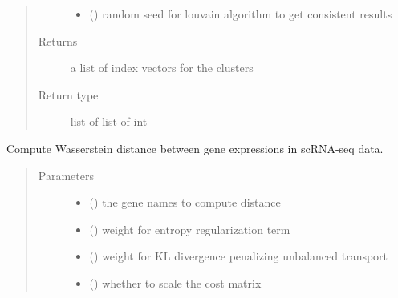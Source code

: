 \documentclass[letterpaper,10pt,english]{sphinxmanual}
\begin{document}
\begin{fulllineitems}
\begin{fulllineitems}
\begin{quote}
\begin{description}
\begin{itemize}
\item {} 
 () \textendash{} random seed for louvain algorithm to get consistent results

\end{itemize}

\item[{Returns}] \leavevmode
a list of index vectors for the clusters

\item[{Return type}] \leavevmode
list of list of int

\end{description}\end{quote}

\end{fulllineitems}


\begin{fulllineitems}
\label{\detokenize{api:spaotsc.SpaOTsc.spatial_sc.gene_gene_distance}}
Compute Wasserstein distance between gene expressions in scRNA-seq data.
\begin{quote}\begin{description}
\item[{Parameters}] \leavevmode\begin{itemize}
\item {} 
 () \textendash{} the gene names to compute distance

\item {} 
 (\sphinxstyleliteralemphasis{, }) \textendash{} weight for entropy regularization term

\item {} 
 (\sphinxstyleliteralemphasis{, }) \textendash{} weight for KL divergence penalizing unbalanced transport

\item {} 
 (\sphinxstyleliteralemphasis{, }) \textendash{} whether to scale the cost matrix


\end{itemize}
\end{description}
\end{quote}
\end{fulllineitems}
\end{fulllineitems}
\end{document}
